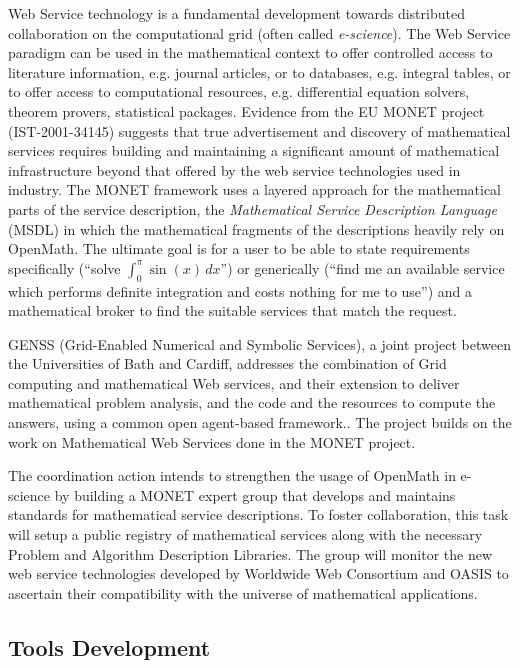 \documentclass{euproposal}
\begin{document}
Web Service technology is a fundamental development towards
distributed collaboration on the computational grid (often called
\emph{e-science}).  The Web Service paradigm can be used in the
mathematical context to offer controlled access to literature
information, e.g. journal articles, or to databases, e.g.  integral
tables, or to offer access to computational resources, e.g.
differential equation solvers, theorem provers, statistical packages.
Evidence from the EU MONET project (IST-2001-34145) suggests that true
advertisement and discovery of mathematical services requires building
and maintaining a significant amount of mathematical infrastructure
beyond that offered by the web service technologies used in industry.
The MONET framework uses a layered approach for the mathematical parts
of the service description, the \emph{Mathematical Service Description
  Language} (MSDL) in which the mathematical fragments of the
descriptions heavily rely on OpenMath.  The ultimate goal is for a
user to be able to state requirements specifically (``solve
$\int_0^\pi{}\sin(x)\,dx$'') or generically (``find me an available
service which performs definite integration and costs nothing for me
to use'') and a mathematical broker to find the suitable services that
match the request.

GENSS (Grid-Enabled Numerical and Symbolic Services), a joint project
between the Universities of Bath and Cardiff, addresses the
combination of Grid computing and mathematical Web services, and their
extension to deliver mathematical problem analysis, and the code and
the resources to compute the answers, using a common open agent-based
framework.. The project builds on the work on Mathematical Web
Services done in the MONET project.

The coordination action intends to strengthen the usage of OpenMath in
e-science by building a MONET expert group that develops and
maintains standards for mathematical service descriptions. To foster
collaboration, this task will setup a public registry of mathematical
services along with the necessary Problem and Algorithm Description
Libraries.  The group will monitor the new web service technologies
developed by Worldwide Web Consortium and OASIS to ascertain their
compatibility with the universe of mathematical applications.


\subsection{Tools Development}\label{tools}
\end{document}
